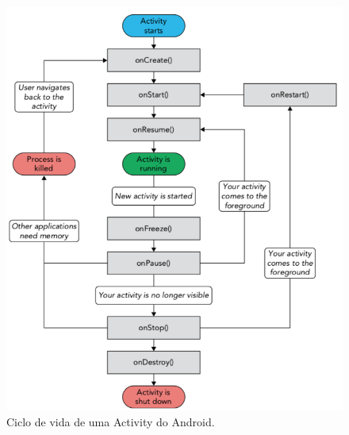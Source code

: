 \begin{figure}[htb]
    \centering
    \includegraphics[width=\textwidth]{images/android_activity_lifecycle}
    \caption[Exemplo de detecção das trilhas de transformações]
    {Ciclo de vida de uma Activity do Android.}%
    \label{fig:android_activity_lifecycle}
\end{figure}


